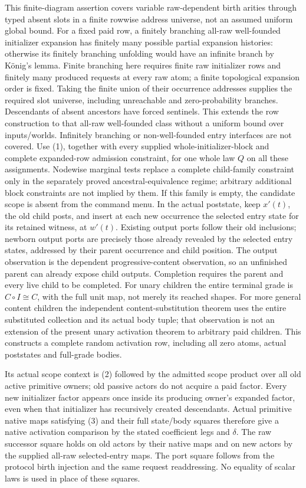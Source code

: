 \documentclass[11pt]{article}
\begin{document}
This finite-diagram assertion covers variable raw-dependent birth arities through typed absent slots in a finite rowwise address universe, not an assumed uniform global bound. For a fixed paid row, a finitely branching all-raw well-founded initializer expansion has finitely many possible partial expansion histories: otherwise its finitely branching unfolding would have an infinite branch by K\"onig's lemma. Finite branching here requires finite raw initializer rows and finitely many produced requests at every raw atom; a finite topological expansion order is fixed. Taking the finite union of their occurrence addresses supplies the required slot universe, including unreachable and zero-probability branches. Descendants of absent ancestors have forced sentinels. This extends the row construction to that all-raw well-founded class without a uniform bound over inputs/worlds. Infinitely branching or non-well-founded entry interfaces are not covered. Use (1), together with every supplied whole-initializer-block and complete expanded-row admission constraint, for one whole law $Q$ on all these assignments. Nodewise marginal tests replace a complete child-family constraint only in the separately proved ancestral-equivalence regime; arbitrary additional block constraints are not implied by them. If this family is empty, the candidate scope is absent from the command menu. In the actual poststate, keep $x'(t)$, the old child posts, and insert at each new occurrence the selected entry state for its retained witness, at $w'(t)$. Existing output ports follow their old inclusions; newborn output ports are precisely those already revealed by the selected entry states, addressed by their parent occurrence and child position. The output observation is the dependent progressive-content observation, so an unfinished parent can already expose child outputs. Completion requires the parent and every live child to be completed. For unary children the entire terminal grade is $C\circ I\cong C$, with the full unit map, not merely its reached shapes. For more general content children the independent content-substitution theorem uses the entire substituted collection and its actual body tuple; that observation is not an extension of the present unary activation theorem to arbitrary paid children. This constructs a complete random activation row, including all zero atoms, actual poststates and full-grade bodies.

Its actual scope context is (2) followed by the admitted scope product over all old active primitive owners; old passive actors do not acquire a paid factor. Every new initializer factor appears once inside its producing owner's expanded factor, even when that initializer has recursively created descendants. Actual primitive native maps satisfying (3) and their full state/body squares therefore give a native activation comparison by the stated coefficient legs and $\delta$. The raw successor square holds on old actors by their native maps and on new actors by the supplied all-raw selected-entry maps. The port square follows from the protocol birth injection and the same request readdressing. No equality of scalar laws is used in place of these squares.
\end{document}
